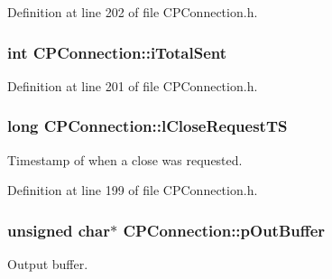 \-Definition at line 202 of file \-C\-P\-Connection.\-h.

\hypertarget{class_c_p_connection_a4c90b5b3376f330b9347b2f48dc80d0e}{
\subsubsection[{i\-Total\-Sent}]{\setlength{\rightskip}{0pt plus 5cm}int {\bf \-C\-P\-Connection\-::i\-Total\-Sent}}}\label{class_c_p_connection_a4c90b5b3376f330b9347b2f48dc80d0e}


\-Definition at line 201 of file \-C\-P\-Connection.\-h.

\hypertarget{class_c_p_connection_aa267a7859ca43e74af4a62bbaaac3d63}{
\subsubsection[{l\-Close\-Request\-T\-S}]{\setlength{\rightskip}{0pt plus 5cm}long {\bf \-C\-P\-Connection\-::l\-Close\-Request\-T\-S}}}\label{class_c_p_connection_aa267a7859ca43e74af4a62bbaaac3d63}


\-Timestamp of when a close was requested. 



\-Definition at line 199 of file \-C\-P\-Connection.\-h.

\hypertarget{class_c_p_connection_a75a016a1c397b5646591eead6aabdfc5}{
\subsubsection[{p\-Out\-Buffer}]{\setlength{\rightskip}{0pt plus 5cm}unsigned char$\ast$ {\bf \-C\-P\-Connection\-::p\-Out\-Buffer}}}\label{class_c_p_connection_a75a016a1c397b5646591eead6aabdfc5}


\-Output buffer. 



